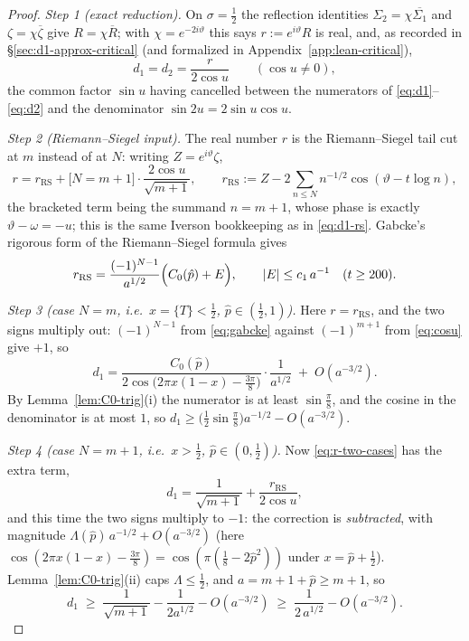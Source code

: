 \documentclass[11pt]{article}
\theoremstyle{definition}
\begin{document}
\begin{proof}
\emph{Step 1 (exact reduction).} On $\sigma=\tfrac12$ the reflection
identities $\Sigma_2=\chi\overline{\Sigma_1}$ and $\zeta=\chi\overline\zeta$
give $R=\chi\overline R$; with $\chi=e^{-2i\vartheta}$ this says
$r:=e^{i\vartheta}R$ is real, and, as recorded in
\S\ref{sec:d1-approx-critical} (and formalized in
Appendix~\ref{app:lean-critical}),
\begin{equation}\label{eq:exact-line}
d_1=d_2=\frac{r}{2\cos u}
\qquad(\cos u\neq0),
\end{equation}
the common factor $\sin u$ having cancelled between the numerators of
\eqref{eq:d1}--\eqref{eq:d2} and the denominator
$\sin2u=2\sin u\cos u$.

\emph{Step 2 (Riemann--Siegel input).} The real number $r$ is the
Riemann--Siegel tail cut at $m$ instead of at $N$: writing
$Z=e^{i\vartheta}\zeta$,
\begin{equation}\label{eq:r-two-cases}
r=r_{\mathrm{RS}}+\bigl[N=m+1\bigr]\cdot\frac{2\cos u}{\sqrt{m+1}},
\qquad
r_{\mathrm{RS}}:=Z-2\!\!\sum_{n\leq N}\!n^{-1/2}\cos(\vartheta-t\log n),
\end{equation}
the bracketed term being the summand $n=m+1$, whose phase is exactly
$\vartheta-\omega=-u$; this is the same Iverson bookkeeping as in
\eqref{eq:d1-rs}. Gabcke's rigorous form of the Riemann--Siegel formula
\cite{Gabcke1979} gives
\begin{equation}\label{eq:gabcke}
r_{\mathrm{RS}}=\frac{(-1)^{N-1}}{a^{1/2}}\Bigl(C_0(\hat p)+E\Bigr),
\qquad |E|\leq c_1\,a^{-1}\quad(t\geq200).
\end{equation}

\emph{Step 3 (case $N=m$, i.e.\ $x=\{T\}<\tfrac12$,
$\hat p\in(\tfrac12,1)$).} Here $r=r_{\mathrm{RS}}$, and the two signs
multiply out: $(-1)^{N-1}$ from \eqref{eq:gabcke} against $(-1)^{m+1}$ from
\eqref{eq:cosu} give $+1$, so
\[
d_1=\frac{C_0(\hat p)}
{2\cos\bigl(2\pi x(1-x)-\tfrac{3\pi}8\bigr)}\cdot\frac{1}{a^{1/2}}
\;+\;O(a^{-3/2}).
\]
By Lemma~\ref{lem:C0-trig}(i) the numerator is at least $\sin\tfrac\pi8$,
and the cosine in the denominator is at most $1$, so
$d_1\geq\bigl(\tfrac12\sin\tfrac\pi8\bigr)a^{-1/2}-O(a^{-3/2})$.

\emph{Step 4 (case $N=m+1$, i.e.\ $x>\tfrac12$,
$\hat p\in(0,\tfrac12)$).} Now \eqref{eq:r-two-cases} has the extra term,
\[
d_1=\frac1{\sqrt{m+1}}+\frac{r_{\mathrm{RS}}}{2\cos u},
\]
and this time the two signs multiply to $-1$: the correction is
\emph{subtracted}, with magnitude $\Lambda(\hat p)\,a^{-1/2}+O(a^{-3/2})$
(here $\cos(2\pi x(1-x)-\tfrac{3\pi}8)=\cos(\pi(\tfrac18-2\hat p^{2}))$
under $x=\hat p+\tfrac12$). Lemma~\ref{lem:C0-trig}(ii) caps
$\Lambda\leq\tfrac12$, and $a=m+1+\hat p\geq m+1$, so
\[
d_1\;\geq\;\frac1{\sqrt{m+1}}-\frac{1}{2a^{1/2}}-O(a^{-3/2})
\;\geq\;\frac{1}{2\,a^{1/2}}-O(a^{-3/2}).
\]


\end{proof}
\end{document}

